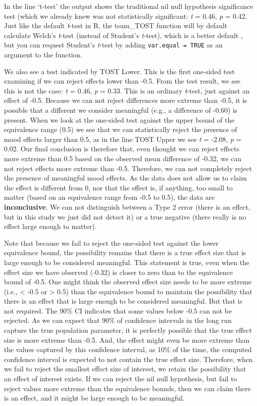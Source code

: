 \documentclass[
  oneside]{book}
\begin{document}
In the line `t-test' the output shows the traditional nil null hypothesis significance test (which we already knew was not statistically significant: \emph{t} = 0.46, \emph{p} = 0.42. Just like the default \emph{t}-test in R, the tsum\_TOST function will by default calculate Welch's \emph{t}-test (instead of Student's \emph{t}-test), which is a better default \citep{delacre_why_2017}, but you can request Student's \emph{t}-test by adding \texttt{var.equal\ =\ TRUE} as an argument to the function.

We also see a test indicated by TOST Lower. This is the first one-sided test examining if we can reject effects lower than -0.5. From the test result, we see this is not the case: \emph{t} = 0.46, \emph{p} = 0.33. This is an ordinary \emph{t}-test, just against an effect of -0.5. Because we can not reject differences more extreme than -0.5, it is possible that a different we consider meaningful (e.g., a difference of -0.60) is present. When we look at the one-sided test against the upper bound of the equivalence range (0.5) we see that we can statistically reject the presence of mood effects larger than 0.5, as in the line TOST Upper we see \emph{t} = -2.08, \emph{p} = 0.02. Our final conclusion is therefore that, even thought we can reject effects more extreme than 0.5 based on the observed mean difference of -0.32, we can not reject effects more extreme than -0.5. Therefore, we can not completely reject the presence of meaningful mood effects. As the data does not allow us to claim the effect is different from 0, nor that the effect is, if anything, too small to matter (based on an equivalence range from -0.5 to 0.5), the data are \textbf{inconclusive}. We can not distinguish between a Type 2 error (there is an effect, but in this study we just did not detect it) or a true negative (there really is no effect large enough to matter).

Note that because we fail to reject the one-sided test against the lower equivalence bound, the possibility remains that there is a true effect size that is large enough to be considered meaningful. This statement is true, even when the effect size we have observed (-0.32) is closer to zero than to the equivalence bound of -0.5. One might think the observed effect size needs to be more extreme (i.e., \textless{} -0.5 or \textgreater{} 0.5) than the equivalence bound to maintain the possibility that there is an effect that is large enough to be considered meaningful. But that is not required. The 90\% CI indicates that some values below -0.5 can not be rejected. As we can expect that 90\% of confidence intervals in the long run capture the true population parameter, it is perfectly possible that the true effect size is more extreme than -0.5. And, the effect might even be more extreme than the values captured by this confidence interval, as 10\% of the time, the computed confidence interval is expected to not contain the true effect size. Therefore, when we fail to reject the smallest effect size of interest, we retain the possibility that an effect of interest exists. If we can reject the nil null hypothesis, but fail to reject values more extreme than the equivalence bounds, then we can claim there is an effect, and it might be large enough to be meaningful.
\end{document}
